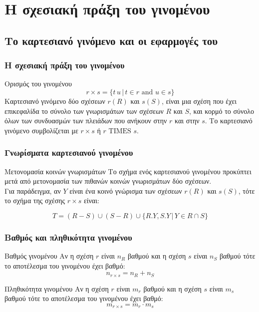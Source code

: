 
\section[{\en Cartesian Product}]{\textgreek{Η σχεσιακή πράξη του γινομένου}}
\subsection[{\en Cartesian Product}]{\textgreek{Το καρτεσιανό γινόμενο και οι εφαρμογές του}}

\begin{frame}
\frametitle{Η σχεσιακή πράξη του γινομένου}
\begin{minipage}{\wE}
  \begin{block}{Ορισμός του γινομένου} \en \Large
    \[
       r \times s = \{ t \, u \, | \, t \in r \text{ and }  u \in s\}
    \]
    \el
    \large
    {\bb Καρτεσιανό γινόμενο} δύο σχέσεων $r(R)$ και $s(S)$,
    είναι μια σχέση που έχει επικεφαλίδα το σύνολο των γνωρισμάτων των σχέσεων $R$ και $S$,
    και κορμό το σύνολο όλων των συνδυασμών
    των πλειάδων που ανήκουν στην $r$ και στην $s$.
    Το καρτεσιανό γινόμενο συμβολίζεται με $r \times s$  ή {\en $r \text{ TIMES } s$}.
  \end{block}
\end{minipage}
\end{frame}


\begin{frame}
\frametitle{Γνωρίσματα καρτεσιανού γινομένου}
\begin{minipage}{\wE}
  \begin{block}{Μετονομασία κοινών γνωρισμάτων}
    Το σχήμα ενός καρτεσιανού γινομένου προκύπτει μετά από μετονομασία
    των πιθανών κοινών γνωρισμάτων δύο σχέσεων. \\
    Για παράδειγμα, αν $Y$ είναι ένα κοινό γνώρισμα των σχέσεων $r(R)$ και $s(S)$,
    τότε το σχήμα της σχέσης $r \times s$ είναι:
    \par
    \large
    \[
       T = (R-S) \cup (S-R) \cup \{R.Y , S.Y \,|\, Y \in R \cap S\}
    \]
  \end{block}
\end{minipage}
\end{frame}


\begin{frame}
\frametitle{Βαθμός και πληθικότητα γινομένου}
\begin{minipage}{\wE}
  \begin{block}{Βαθμός γινομένου}
    Αν η σχέση $r$ είναι $n_R$ βαθμού
    και η σχέση $s$ είναι $n_S$ βαθμού τότε το αποτέλεσμα του γινομένου έχει βαθμό:
    \[
       n_{r \times s}  = n_R + n_S
    \]
  \end{block}
  \begin{block}{Πληθικότητα γινομένου}
    Αν η σχέση $r$ είναι $m_r$ βαθμού
    και η σχέση $s$ είναι $m_s$ βαθμού τότε το αποτέλεσμα του γινομένου έχει βαθμό:
    \[
       m_{r \times s}  =m_r \cdot m_s
    \]
  \end{block}
\end{minipage}
\end{frame}



